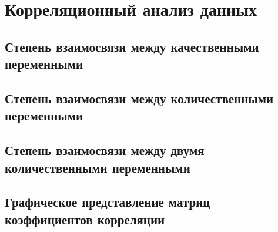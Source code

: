 \section{Корреляционный анализ данных}

\subsection{Степень взаимосвязи между качественными переменными}

\subsection{Степень взаимосвязи между количественными переменными}

\subsection{Степень взаимосвязи между двумя количественными переменными}

\subsection{Графическое представление матриц коэффициентов корреляции}